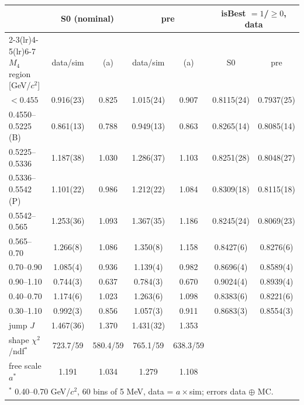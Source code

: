 \begin{tabular}{lcccccc}
\toprule
 & \multicolumn{2}{c}{S0 (nominal)} & \multicolumn{2}{c}{pre} & \multicolumn{2}{c}{isBest $=1$/$\geq 0$, data}\\
\cmidrule(lr){2-3}\cmidrule(lr){4-5}\cmidrule(lr){6-7}
$M_4$ region [GeV/$c^2$] & data/sim & (a) & data/sim & (a) & S0 & pre\\
\midrule
$<0.455$ & 0.916(23) & 0.825 & 1.015(24) & 0.907 & 0.8115(24) & 0.7937(25)\\
0.4550--0.5225 (B) & 0.861(13) & 0.788 & 0.949(13) & 0.863 & 0.8265(14) & 0.8085(14)\\
0.5225--0.5336 & 1.187(38) & 1.030 & 1.286(37) & 1.103 & 0.8251(28) & 0.8048(27)\\
0.5336--0.5542 (P) & 1.101(22) & 0.986 & 1.212(22) & 1.084 & 0.8309(18) & 0.8115(18)\\
0.5542--0.565 & 1.253(36) & 1.093 & 1.367(35) & 1.186 & 0.8245(24) & 0.8069(23)\\
0.565--0.70 & 1.266(8) & 1.086 & 1.350(8) & 1.158 & 0.8427(6) & 0.8276(6)\\
0.70--0.90 & 1.085(4) & 0.936 & 1.139(4) & 0.982 & 0.8696(4) & 0.8589(4)\\
0.90--1.10 & 0.744(3) & 0.637 & 0.784(3) & 0.670 & 0.9024(4) & 0.8939(4)\\
\midrule
0.40--0.70 & 1.174(6) & 1.023 & 1.263(6) & 1.098 & 0.8383(6) & 0.8221(6)\\
0.30--1.10 & 0.992(3) & 0.856 & 1.057(3) & 0.911 & 0.8683(3) & 0.8554(3)\\
\midrule
jump $J$ & 1.467(36) & 1.370 & 1.431(32) & 1.353 & & \\
shape $\chi^2$/ndf$^{*}$ & 723.7/59 & 580.4/59 & 765.1/59 & 638.3/59 & & \\
\quad free scale $a^{*}$ & 1.191 & 1.034 & 1.279 & 1.108 & & \\
\bottomrule
\multicolumn{7}{l}{\footnotesize $^{*}$ 0.40--0.70 GeV/$c^2$, 60 bins of 5 MeV, data = $a\times$sim; errors data $\oplus$ MC.}\\
\end{tabular}
